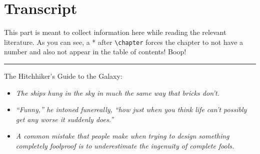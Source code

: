 \documentclass[../bachelor_paper.tex]{subfiles}
\begin{document}
\chapter{Transcript}
    This part is meant to collect information here while reading the relevant literature.
    As you can see, a * after \texttt{\textbackslash{}chapter} forces the chapter to not have a number and also not appear in the table of contents! Boop!
    
    
    
    \bigskip\hrule
    
    The Hitchhiker's Guide to the Galaxy:
    \begin{itemize}
        \item \textit{The ships hung in the sky in much the same way that bricks don't.}
        \item \textit{``Funny,'' he intoned funereally, ``how just when you think life can’t possibly get any worse it suddenly does.''}
        \item \textit{A common mistake that people make when trying to design something completely foolproof is to underestimate the ingenuity of complete fools.}
    \end{itemize}

\isstandalone



\fi
\end{document}
